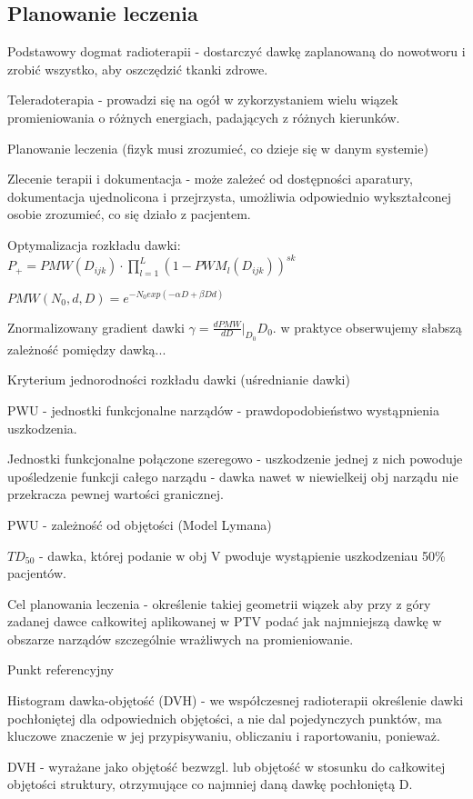 \documentclass{article}
\begin{document}
\subsection{Planowanie leczenia}

Podstawowy dogmat radioterapii - dostarczyć dawkę zaplanowaną do nowotworu i zrobić wszystko, aby oszczędzić tkanki zdrowe.

Teleradoterapia - prowadzi się na ogół w zykorzystaniem wielu wiązek promieniowania o różnych energiach, padających z różnych kierunków.

Planowanie leczenia (fizyk musi zrozumieć, co dzieje się w danym systemie)

Zlecenie terapii i dokumentacja - może zależeć od dostępności aparatury, dokumentacja ujednolicona i przejrzysta, umożliwia odpowiednio wykształconej osobie zrozumieć, co się działo z pacjentem.

Optymalizacja rozkładu dawki: $P_+ = PMW(D_{ijk}) \cdot \prod_{l=1}^{L}(1-PWM_l(D_{ijk}))^{sk}$

$PMW(N_0, d, D) = e^{-N_0exp(-\alpha D + \beta D d)}$

Znormalizowany gradient dawki $\gamma = \frac{dPMW}{dD}|_{D_{0}}D_0$. w praktyce obserwujemy słabszą zależność pomiędzy dawką...

Kryterium jednorodności rozkładu dawki (uśrednianie dawki)

PWU - jednostki funkcjonalne narządów - prawdopodobieństwo wystąpnienia uszkodzenia.

Jednostki funkcjonalne połączone szeregowo - uszkodzenie jednej z nich powoduje upośledzenie funkcji całego narządu - dawka nawet w niewielkeij obj narządu nie przekracza pewnej wartości granicznej.

PWU - zależność od objętości (Model Lymana)

$TD_{50}$ - dawka, której podanie w obj V pwoduje wystąpienie uszkodzeniau 50\% pacjentów.

Cel planowania leczenia - określenie takiej geometrii wiązek aby przy z góry zadanej dawce całkowitej aplikowanej w PTV podać jak najmniejszą dawkę w obszarze narządów szczególnie wrażliwych na promieniowanie.

Punkt referencyjny

Histogram dawka-objętość (DVH) - we współczesnej radioterapii określenie dawki pochłoniętej dla odpowiednich objętości, a nie dal pojedynczych punktów, ma kluczowe znaczenie w jej przypisywaniu, obliczaniu i raportowaniu, ponieważ.

DVH - wyrażane jako objętość bezwzgl. lub objętość w stosunku do całkowitej objętości struktury, otrzymujące co najmniej daną dawkę pochłoniętą D.
\end{document}
